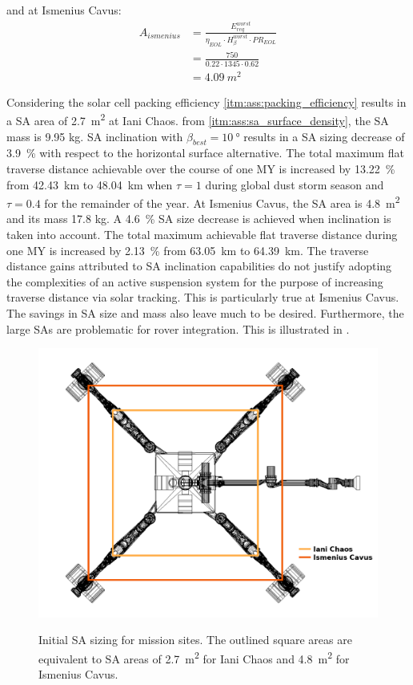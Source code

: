 and at Ismenius Cavus:
\begin{align}
  \label{calc:solar_cell_area_ismenius_cavus_traverse}
  A_{ismenius} &= \frac{E_{req}^{worst}}{\eta_{EOL} \cdot H_{\beta}^{worst} \cdot PR_{EOL}}\\
               &= \frac{750}{0.22 \cdot 1345 \cdot 0.62}\\
               &= \SI{4.09}{m^{2}}
\end{align}

Considering the solar cell packing efficiency \ref{itm:ass:packing_efficiency} results in a \ac{SA} area of \SI{2.7}{m^{2}} at Iani Chaos. from \ref{itm:ass:sa_surface_density}, the \ac{SA} mass is 9.95 \si{\kilo\gram}. \ac{SA} inclination with $\beta_{best} = \SI{10}{\degree}$ results in a \ac{SA} sizing decrease of \SI{3.9}{\percent} with respect to the horizontal surface alternative. The total maximum flat traverse distance achievable over the course of one \ac{MY} is increased by \SI{13.22}{\percent} from \SI{42.43}{\kilo\meter} to \SI{48.04}{\kilo\meter} when $\tau = 1$ during global dust storm season and $\tau = 0.4$ for the remainder of the year. At Ismenius Cavus, the \ac{SA} area is \SI{4.8}{m^{2}} and its mass 17.8 \si{\kilo\gram}. A \SI{4.6}{\percent} \ac{SA} size decrease is achieved when inclination is taken into account. The total maximum achievable flat traverse distance during one \ac{MY} is increased by \SI{2.13}{\percent} from \SI{63.05}{\kilo\meter} to \SI{64.39}{\kilo\meter}. The traverse distance gains attributed to \ac{SA} inclination capabilities do not justify adopting the complexities of an active suspension system for the purpose of increasing traverse distance via solar tracking. This is particularly true at Ismenius Cavus. The savings in \ac{SA} size and mass also leave much to be desired. Furthermore, the large \acp{SA} are problematic for rover integration. This is illustrated in .

\begin{figure}[h]
  \captionsetup[subfigure]{justification=centering}
  \centering
  \hypersetup{linkcolor=captionTextColor}
  \includegraphics[width=0.7\linewidth]{sections/design/solar-array/images/sa-area-initial-sizes.png}\\
  \caption[Initial solar array sizing for mission sites]
          {Initial \ac{SA} sizing for mission sites. The outlined square areas are equivalent to \ac{SA} areas of \SI{2.7}{m^{2}} for Iani Chaos and \SI{4.8}{m^{2}} for Ismenius Cavus.}
  \label{fig:sa-area-initial-sizes}
\end{figure}

